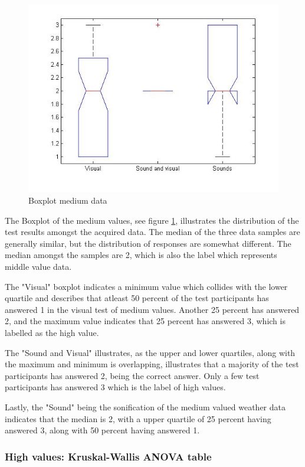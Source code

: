 \begin{figure}[!htbp]
    \centering
    \includegraphics[width=.5\textwidth]{images/Evaluation7.jpg}
    \caption{Boxplot medium data}
    \label{fig:evaluation5}
\end{figure}

The Boxplot of the medium values, see figure \ref{fig:evaluation5}, illustrates the distribution of the test results amongst the acquired data. The median of the three data samples are generally similar, but the distribution of responses are somewhat different. The median amongst the samples are 2, which is also the label which represents middle value data.

The "Visual" boxplot indicates a minimum value which collides with the lower quartile and describes that atleast 50 percent of the test participants has answered 1 in the visual test of medium values. Another 25 percent has answered 2, and the maximum value indicates that 25 percent has answered 3, which is labelled as the high value. 

The "Sound and Visual" illustrates, as the upper and lower quartiles, along with the maximum and minimum is overlapping, illustrates that a majority of the test participants has answered 2, being the correct answer. Only a few test participants has answered 3 which is the label of high values.

Lastly, the "Sound" being the sonification of the medium valued weather data indicates that the median is 2, with a upper quartile of 25 percent having answered 3, along with 50 percent having answered 1.



      
      
    \subsubsection*{High values: Kruskal-Wallis ANOVA table} %
\label{ssub:high_values_kruskal_wallis_anova_table}

